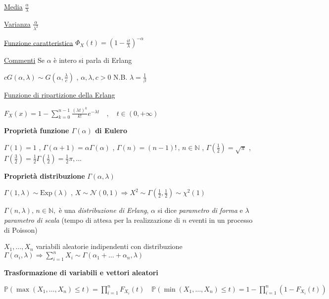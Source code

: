 \documentclass[openany]{book} %
\begin{document}
\begin{multicols}{2}
\underline{Media} $\frac{\alpha}{\lambda}$

\underline{Varianza} $\frac{\alpha}{\lambda^2}$

\underline{Funzione caratteristica} $\Phi_X(t)=\left(1-\frac{it}{\lambda}\right)^{-\alpha}$

\underline{Commenti} Se $\alpha$ è intero si parla di Erlang 

$cG(\alpha, \lambda)\sim G(\alpha,\frac{\lambda}{c})$ , $\alpha,\lambda,c>0$ N.B. $\lambda=\frac{1}{\beta}$

\underline{Funzione di ripartizione della Erlang} 

$F_X(x)=1-\sum_{k=0}^{n-1}\frac{(\lambda t)^k}{k!}e^{-\lambda t} \quad , \quad t\in(0,+\infty)$

\end{multicols}

\textbf{Proprietà funzione $\Gamma(\alpha)$ di Eulero} 

$\Gamma(1)=1$ , \quad 
$\Gamma(\alpha+1) = \alpha\Gamma(\alpha)$ , \quad
$\Gamma(n)=(n-1)!\,,\,n\in \mathbb{N}$ , \quad 
$\Gamma(\frac{1}{2})=\sqrt {\pi}$ , \quad 
$\Gamma(\frac{3}{2})=\frac{1}{2}\Gamma(\frac{1}{2})=\frac{1}{2}\pi,\dots$

\textbf{Proprietà distribuzione} $\Gamma(\alpha,\lambda)$

$\Gamma(1,\lambda) \sim \text{Exp}(\lambda)$ , \quad $X\sim \mathcal {N}(0,1)\Rightarrow X^2\sim\Gamma(\frac{1}{2},\frac{1}{2})\sim\chi^2(1)$ 

$\Gamma(n,\lambda),\,n\in \mathbb{N},$ è una \textit{distribuzione di Erlang}, $\alpha$ si dice \textit{parametro di forma} e $\lambda$ \textit{parametro di scala} (tempo di attesa per la realizzazione di $n$ eventi in un processo di Poisson)

$X_1,\dots,X_n$ variabili aleatorie indipendenti con distribuzione $\Gamma(\alpha_i,\lambda)\Rightarrow \sum_{i=1}^nX_i\sim\Gamma(\alpha_1+\dots+\alpha_n,\lambda)$

\textbf{Trasformazione di variabili e vettori aleatori}

$\mathbb{P}(\max(X_1,\dots,X_n)\leq t)=\prod_{i=1}^nF_{X_i}(t) \quad \mathbb{P}(\min(X_1,\dots,X_n)\leq t)=1-\prod_{i=1}^n(1-F_{X_i}(t))$
\end{document}
